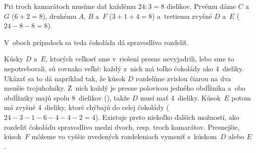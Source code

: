 {Pri troch kamarátoch musíme dať každému $24:3=8$ dielikov. Prvému dáme $C$ a~$G$ ($6+2=8$), druhému $A$, $B$ a~$F$ ($3+1+4=8$) a~tretiemu zvyšné $D$ a~$E$ ($24-8-8=8$).

V~oboch prípadoch sa teda čokoláda dá spravodlivo rozdeliť.

\poznamka
Kúsky $D$ a~$E$, ktorých veľkosť sme v~riešení presne nevyjadrili, lebo sme to nepotrebovali, sú rovnako veľké: každý z~nich má toľko čokolády ako 4~dieliky.
%
Ukázať sa to dá napríklad tak, že kúsok $D$ rozdelíme zvislou čiarou na dva menšie trojuholníky. Z~nich každý je presne polovicou jedného obdĺžnika a~oba obdĺžniky majú spolu 8~dielikov (\obr), takže $D$ musí mať 4~dieliky. Kúsok~$E$ potom má zvyšné 4~dieliky, ktoré chýbajú do celej čokolády ($24-3-1-6-4-4-2=4$). Existuje preto niekoľko ďalších možností, ako rozdeliť čokoládu spravodlivo medzi dvoch, resp. troch kamarátov. Presnejšie, kúsok~$F$ môžeme vo vyššie uvedených rozdeleniach vymeniť s~kúskom~$D$ alebo $E$.
}

